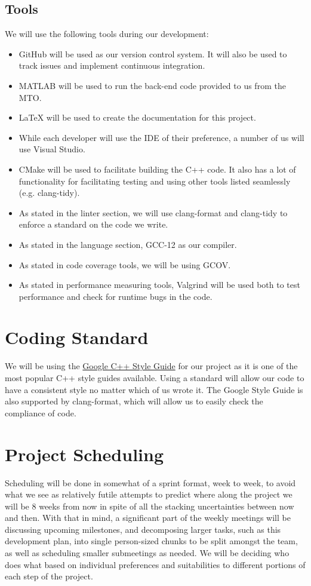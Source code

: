 \documentclass{article}
\begin{document}
\subsection{Tools}
We will use the following tools during our development:
\begin{itemize}
	\item GitHub will be used as our version control system. It will also be used to track issues and implement continuous integration.
	\item MATLAB will be used to run the back-end code provided to us from the MTO.
	\item LaTeX will be used to create the documentation for this project.
	\item While each developer will use the IDE of their preference, a number of us will use Visual Studio.
	\item CMake will be used to facilitate building the C++ code. It also has a lot of functionality for facilitating testing and using other tools listed seamlessly (e.g. clang-tidy).
	\item As stated in the linter section, we will use clang-format and clang-tidy to enforce a standard on the code we write.
	\item As stated in the language section, GCC-12 as our compiler.
	\item As stated in code coverage tools, we will be using GCOV.
	\item As stated in performance measuring tools, Valgrind will be used both to test performance and check for runtime bugs in the code.
\end{itemize}

\section{Coding Standard}
We will be using the \href{https://google.github.io/styleguide/cppguide.html}{Google C++ Style Guide} for our project as it is one of the most popular C++ style guides available. Using a standard will allow our code to have a consistent style no matter which of us wrote it.
The Google Style Guide is also supported by clang-format, which will allow us to easily check the compliance of code.

\section{Project Scheduling}
	Scheduling will be done in somewhat of a sprint format, week to week, to avoid what we see as relatively futile attempts to predict where along the project we will be 8 weeks
from now in spite of all the stacking uncertainties between now and then. With that in mind, a significant part of the weekly meetings will be discussing upcoming milestones,
and decomposing larger tasks, such as this development plan, into single person-sized chunks to be split amongst the team, as well as scheduling smaller submeetings as needed.
We will be deciding who does what based on individual preferences and suitabilities to different portions of each step of the project.\\
\end{document}
